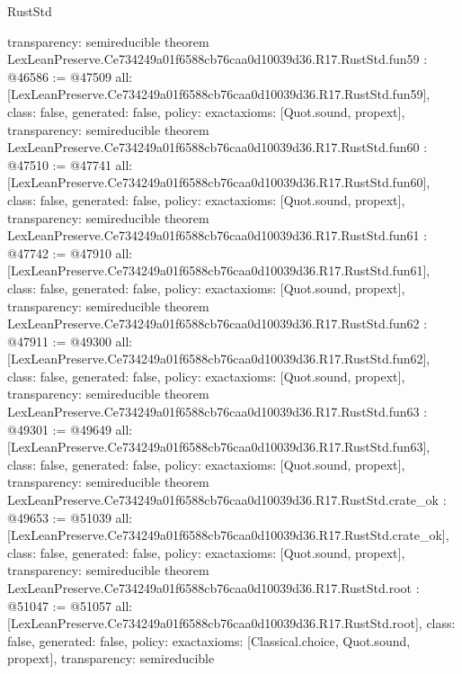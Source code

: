 \begin{lexlean}{RustStd}
\begin{coremodule}
{  transparency: semireducible
}
theorem LexLeanPreserve.Ce734249a01f6588cb76caa0d10039d36.R17.RustStd.fun59 : @46586 := @47509 {
  all: [LexLeanPreserve.Ce734249a01f6588cb76caa0d10039d36.R17.RustStd.fun59],
  class: false,
  generated: false,
  policy: exact{axioms: [Quot.sound, propext]},
  transparency: semireducible
}
theorem LexLeanPreserve.Ce734249a01f6588cb76caa0d10039d36.R17.RustStd.fun60 : @47510 := @47741 {
  all: [LexLeanPreserve.Ce734249a01f6588cb76caa0d10039d36.R17.RustStd.fun60],
  class: false,
  generated: false,
  policy: exact{axioms: [Quot.sound, propext]},
  transparency: semireducible
}
theorem LexLeanPreserve.Ce734249a01f6588cb76caa0d10039d36.R17.RustStd.fun61 : @47742 := @47910 {
  all: [LexLeanPreserve.Ce734249a01f6588cb76caa0d10039d36.R17.RustStd.fun61],
  class: false,
  generated: false,
  policy: exact{axioms: [Quot.sound, propext]},
  transparency: semireducible
}
theorem LexLeanPreserve.Ce734249a01f6588cb76caa0d10039d36.R17.RustStd.fun62 : @47911 := @49300 {
  all: [LexLeanPreserve.Ce734249a01f6588cb76caa0d10039d36.R17.RustStd.fun62],
  class: false,
  generated: false,
  policy: exact{axioms: [Quot.sound, propext]},
  transparency: semireducible
}
theorem LexLeanPreserve.Ce734249a01f6588cb76caa0d10039d36.R17.RustStd.fun63 : @49301 := @49649 {
  all: [LexLeanPreserve.Ce734249a01f6588cb76caa0d10039d36.R17.RustStd.fun63],
  class: false,
  generated: false,
  policy: exact{axioms: [Quot.sound, propext]},
  transparency: semireducible
}
theorem LexLeanPreserve.Ce734249a01f6588cb76caa0d10039d36.R17.RustStd.crate_ok : @49653 := @51039 {
  all: [LexLeanPreserve.Ce734249a01f6588cb76caa0d10039d36.R17.RustStd.crate_ok],
  class: false,
  generated: false,
  policy: exact{axioms: [Quot.sound, propext]},
  transparency: semireducible
}
theorem LexLeanPreserve.Ce734249a01f6588cb76caa0d10039d36.R17.RustStd.root : @51047 := @51057 {
  all: [LexLeanPreserve.Ce734249a01f6588cb76caa0d10039d36.R17.RustStd.root],
  class: false,
  generated: false,
  policy: exact{axioms: [Classical.choice, Quot.sound, propext]},
  transparency: semireducible
}


\end{coremodule}
\end{lexlean}
